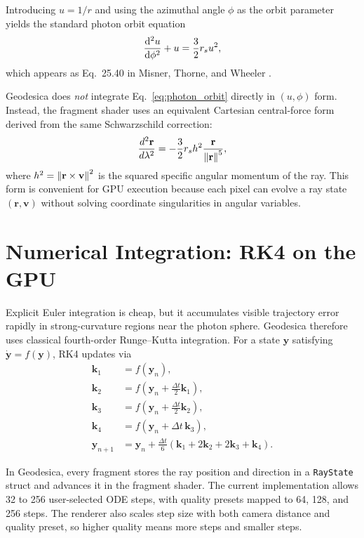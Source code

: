 \documentclass[12pt]{article}
\begin{document}
Introducing $u = 1/r$ and using the azimuthal angle $\phi$ as the orbit parameter yields the standard photon orbit equation
\begin{equation}
\dv[2]{u}{\phi} + u = \frac{3}{2} r_s u^2,
\label{eq:photon_orbit}
\end{equation}
which appears as Eq.~25.40 in Misner, Thorne, and Wheeler \cite{mtw}.

Geodesica does \emph{not} integrate Eq.~\eqref{eq:photon_orbit} directly in $(u,\phi)$ form. Instead, the fragment shader uses an equivalent Cartesian central-force form derived from the same Schwarzschild correction:
\begin{equation}
\frac{d^2 \mathbf{r}}{d\lambda^2} = -\frac{3}{2} r_s h^2 \frac{\mathbf{r}}{\norm{\mathbf{r}}^5},
\label{eq:cartesian_force}
\end{equation}
where $h^2 = \norm{\mathbf{r} \times \mathbf{v}}^2$ is the squared specific angular momentum of the ray. This form is convenient for GPU execution because each pixel can evolve a ray state $(\mathbf{r}, \mathbf{v})$ without solving coordinate singularities in angular variables.

\section{Numerical Integration: RK4 on the GPU}
Explicit Euler integration is cheap, but it accumulates visible trajectory error rapidly in strong-curvature regions near the photon sphere. Geodesica therefore uses classical fourth-order Runge--Kutta integration. For a state $\mathbf{y}$ satisfying $\dot{\mathbf{y}} = f(\mathbf{y})$, RK4 updates via
\begin{align}
\mathbf{k}_1 &= f(\mathbf{y}_n), \\
\mathbf{k}_2 &= f\!\left(\mathbf{y}_n + \frac{\Delta t}{2}\mathbf{k}_1\right), \\
\mathbf{k}_3 &= f\!\left(\mathbf{y}_n + \frac{\Delta t}{2}\mathbf{k}_2\right), \\
\mathbf{k}_4 &= f\!\left(\mathbf{y}_n + \Delta t\,\mathbf{k}_3\right), \\
\mathbf{y}_{n+1} &= \mathbf{y}_n + \frac{\Delta t}{6}\left(\mathbf{k}_1 + 2\mathbf{k}_2 + 2\mathbf{k}_3 + \mathbf{k}_4\right).
\label{eq:rk4}
\end{align}

In Geodesica, every fragment stores the ray position and direction in a \texttt{RayState} struct and advances it in the fragment shader. The current implementation allows 32 to 256 user-selected ODE steps, with quality presets mapped to 64, 128, and 256 steps. The renderer also scales step size with both camera distance and quality preset, so higher quality means more steps and smaller steps.
\end{document}
